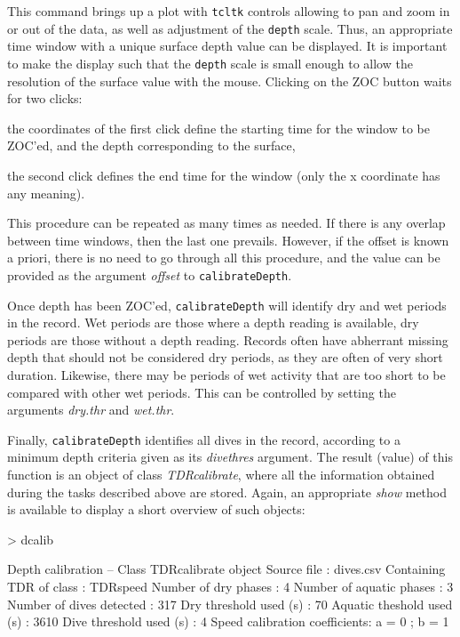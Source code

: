 \documentclass[12pt, letterpaper]{scrartcl}
\newcommand{\Robject}[1]{{\texttt{#1}}}
\newcommand{\Rfunction}[1]{{\texttt{#1}}}
\newcommand{\Rpackage}[1]{{\texttt{#1}}}
\newcommand{\Rclass}[1]{{\textit{#1}}}
\newcommand{\Rmethod}[1]{{\textit{#1}}}
\newcommand{\Rfunarg}[1]{{\textit{#1}}}
\begin{document}
This command brings up a plot with \Rpackage{tcltk} controls allowing to
pan and zoom in or out of the data, as well as adjustment of the
\Robject{depth} scale.  Thus, an appropriate time window with a unique
surface depth value can be displayed.  It is important to make the display
such that the \Robject{depth} scale is small enough to allow the
resolution of the surface value with the mouse.  Clicking on the ZOC
button waits for two clicks:
\begin{compactenum}
\item the coordinates of the first click define the starting time for the
  window to be ZOC'ed, and the depth corresponding to the surface,
\item the second click defines the end time for the window (only the x
  coordinate has any meaning).
\end{compactenum}
This procedure can be repeated as many times as needed.  If there is any
overlap between time windows, then the last one prevails.  However, if the
offset is known a priori, there is no need to go through all this
procedure, and the value can be provided as the argument \Rfunarg{offset}
to \Rfunction{calibrateDepth}.

Once depth has been ZOC'ed, \Rfunction{calibrateDepth} will identify dry
and wet periods in the record.  Wet periods are those where a depth
reading is available, dry periods are those without a depth reading.
Records often have abherrant missing depth that should not be considered
dry periods, as they are often of very short duration.  Likewise, there
may be periods of wet activity that are too short to be compared with
other wet periods.  This can be controlled by setting the arguments
\Rfunarg{dry.thr} and \Rfunarg{wet.thr}.

Finally, \Rfunction{calibrateDepth} identifies all dives in the record,
according to a minimum depth criteria given as its \Rfunarg{divethres}
argument.  The result (value) of this function is an object of class
\Rclass{TDRcalibrate}, where all the information obtained during the tasks
described above are stored.  Again, an appropriate \Rmethod{show} method
is available to display a short overview of such objects:
\begin{Schunk}
\begin{Sinput}
> dcalib
\end{Sinput}
\begin{Soutput}
Depth calibration -- Class TDRcalibrate object
  Source file                   : dives.csv 
  Containing TDR of class       : TDRspeed 
  Number of dry phases          : 4 
  Number of aquatic phases      : 3 
  Number of dives detected      : 317 
  Dry threshold used (s)        : 70 
  Aquatic theshold used (s)     : 3610 
  Dive threshold used (s)       : 4
  Speed calibration coefficients: a = 0 ; b = 1 
\end{Soutput}
\end{Schunk}
\end{document}
